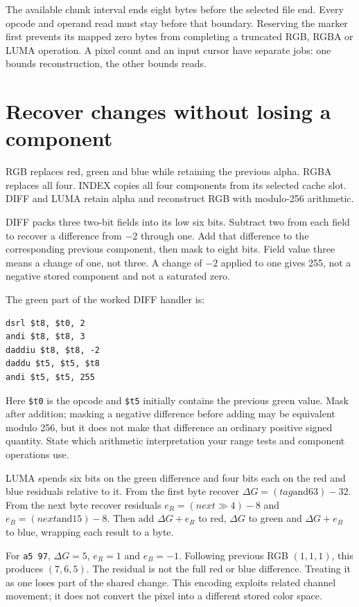 The available chunk interval ends eight bytes before the selected file end.
Every opcode and operand read must stay before that boundary. Reserving the
marker first prevents its mapped zero bytes from completing a truncated RGB,
RGBA or LUMA operation. A pixel count and an input cursor have separate jobs:
one bounds reconstruction, the other bounds reads.

\section{Recover changes without losing a component}

RGB replaces red, green and blue while retaining the previous alpha. RGBA replaces
all four. INDEX copies all four components from its selected cache slot. DIFF
and LUMA retain alpha and reconstruct RGB with modulo-256 arithmetic.

DIFF packs three two-bit fields into its low six bits. Subtract two from each
field to recover a difference from $-2$ through one. Add that difference to the
corresponding previous component, then mask to eight bits. Field value three
means a change of one, not three. A change of $-2$ applied to one gives 255,
not a negative stored component and not a saturated zero.

The green part of the worked DIFF handler is:
\begin{verbatim}
dsrl $t8, $t0, 2
andi $t8, $t8, 3
daddiu $t8, $t8, -2
daddu $t5, $t5, $t8
andi $t5, $t5, 255
\end{verbatim}

Here \texttt{\$t0} is the opcode and \texttt{\$t5} initially contains the
previous green value. Mask after addition; masking a negative difference before
adding may be equivalent modulo 256, but it does not make that difference an
ordinary positive signed quantity. State which arithmetic interpretation your
range tests and component operations use.

LUMA spends six bits on the green difference and four bits each on the red and
blue residuals relative to it. From the first byte recover
$\Delta G=(\mathit{tag}\mathbin{\mathrm{and}}63)-32$. From the next byte recover residuals
$e_R=(\mathit{next}\gg4)-8$ and $e_B=(\mathit{next}\mathbin{\mathrm{and}}15)-8$.
Then add $\Delta G+e_R$ to red, $\Delta G$ to green and $\Delta G+e_B$ to blue,
wrapping each result to a byte.

For \texttt{a5 97}, $\Delta G=5$, $e_R=1$ and $e_B=-1$.
Following previous RGB $(1,1,1)$, this produces $(7,6,5)$.
The residual is not the full red or blue difference. Treating it as one loses
part of the shared change. This encoding exploits related channel movement;
it does not convert the pixel into a different stored color space.

